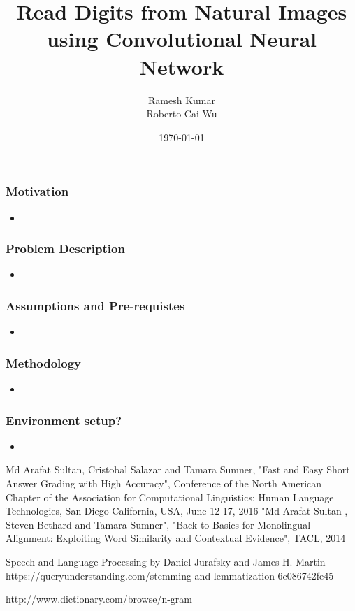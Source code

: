 \documentclass[10.5pt,aspectratio=1610,xcolor={usenames,dvipsnames,table}]{beamer}
\title{Read Digits from Natural Images using Convolutional Neural Network}
\author{Ramesh Kumar \\ Roberto Cai Wu}
\date{\today}
\begin{document}
\begin{frame}
\titlepage
\end{frame}



\begin{frame}

\frametitle{ Motivation}

\begin{itemize}
	
\item 


\end{itemize}


\end{frame}

\begin{frame}
\frametitle{Problem Description}
\begin{itemize}
	\item 
	
\end{itemize}

\end{frame}



\begin{frame}

\frametitle{Assumptions and Pre-requistes
}
\begin{itemize}
	\item 
\end{itemize}
\end{frame}

\begin{frame}
\frametitle{Methodology}

\begin{itemize}
	\item 
\end{itemize}
\end{frame}


\begin{frame}
\frametitle{Environment setup?}
\begin{itemize}
	\item  
\end{itemize}
\end{frame}




\begin{thebibliography}{9}
Md Arafat Sultan, Cristobal Salazar and Tamara Sumner, "Fast and Easy Short Answer Grading with High Accuracy", Conference of the North American Chapter of the Association for Computational Linguistics: Human Language Technologies, San Diego California, USA, June 12-17, 2016
"Md Arafat Sultan
	, Steven Bethard and Tamara Sumner", "Back to Basics for Monolingual Alignment: Exploiting Word Similarity and
	Contextual Evidence",  TACL, 2014

Speech and Language Processing by Daniel Jurafsky and James H. Martin
 https://queryunderstanding.com/stemming-and-lemmatization-6c086742fe45

 http://www.dictionary.com/browse/n-gram


\end{thebibliography}
\end{document}
